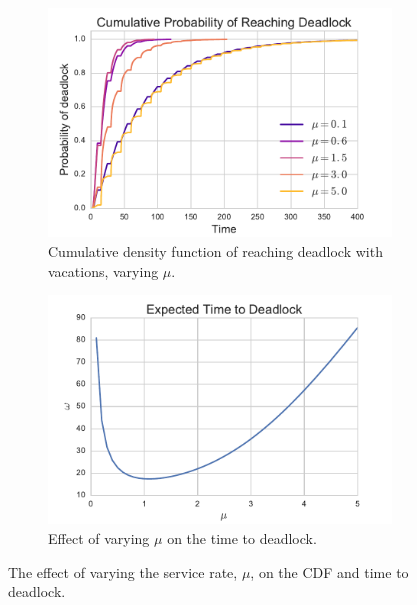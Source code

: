 \documentclass{article}
\begin{document}
\begin{figure}
\begin{center}
\begin{subfigure}[b]{0.45\textwidth}
    \includegraphics[width=\textwidth]{img/cdf_vary_mu.pdf}
    \caption{Cumulative density function of reaching deadlock with vacations, varying $\mu$.}
    \label{fig:cdf_varymu}
\end{subfigure}
\begin{subfigure}[b]{0.45\textwidth}
    \includegraphics[width=\textwidth]{img/ttd_vary_mu.pdf}
    \caption{Effect of varying $\mu$ on the time to deadlock.}
    \label{fig:ttd_varymu}
\end{subfigure}
\end{center}
\caption{The effect of varying the service rate, $\mu$, on the CDF and time to deadlock.}
\label{fig:ttdcdf_varymu}
\end{figure}
\end{document}
